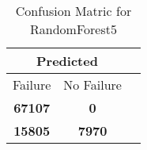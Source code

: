 \begin{table}[] 
\caption{Confusion Matric for RandomForest5} 
\label{Table: Prediction Accuracy-DMDRandomForest5OnlySunEKF-resetReflectionperfectNoFailurePrediction-Reflection} 
\centering 
\begin{tabular} 
 {@{}ccc@{}} 
\toprule 
\multicolumn{2}{c}{\textbf{Predicted}}
 \\ \midrule 
\multicolumn{1}{|c|}{Failure} & 
\multicolumn{1}{c|}{No Failure}
 \\ \midrule 
\multicolumn{1}{|c|}{\color{green}\textbf{67107}} & 
\multicolumn{1}{c|}{\color{red}\textbf{0}}
 \\ \midrule 
\multicolumn{1}{|c|}{\color{red}\textbf{15805}} & 
\multicolumn{1}{c|}{\color{green}\textbf{7970}}
 \\ \bottomrule 
\end{tabular} 
\end{table} 
